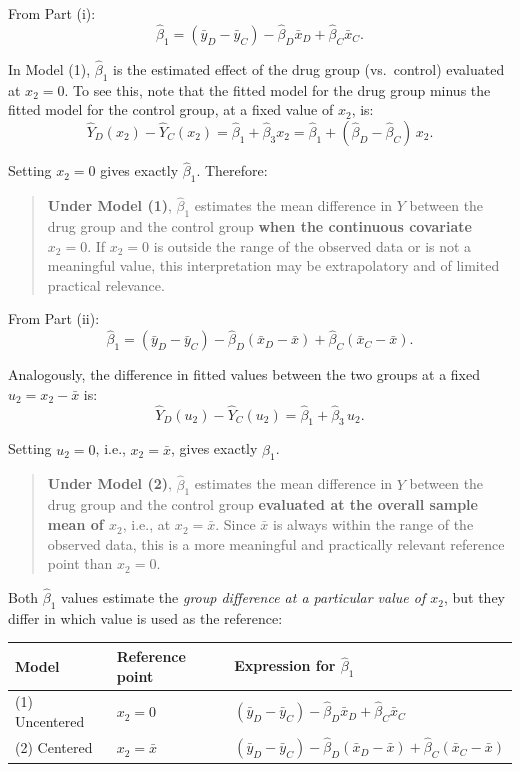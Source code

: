 \documentclass[letterpaper]{article}
\begin{document}
	From Part (i):
	\[
	\hat{\beta}_1 = (\bar{y}_D - \bar{y}_C) - \hat{\beta}_D \bar{x}_D + \hat{\beta}_C \bar{x}_C.
	\]
	
	In Model (1), $\hat{\beta}_1$ is the estimated effect of the drug group (vs.\ control) {evaluated at $x_2 = 0$}. To see this, note that the fitted model for the drug group minus the fitted model for the control group, at a fixed value of $x_2$, is:
	\[
	\hat{Y}_D(x_2) - \hat{Y}_C(x_2)
	= \hat{\beta}_1 + \hat{\beta}_3 x_2
	= \hat{\beta}_1 + (\hat{\beta}_D - \hat{\beta}_C)\, x_2.
	\]
	
	Setting $x_2 = 0$ gives exactly $\hat{\beta}_1$. Therefore:
	
	\begin{quote}
		\textbf{Under Model (1)}, $\hat{\beta}_1$ estimates the mean difference in $Y$ between the drug group and the control group \textbf{when the continuous covariate $x_2 = 0$}. If $x_2 = 0$ is outside the range of the observed data or is not a meaningful value, this interpretation may be extrapolatory and of limited practical relevance.
	\end{quote}

	
	From Part (ii):
	\[
	\hat{\beta}_1 = (\bar{y}_D - \bar{y}_C) - \hat{\beta}_D(\bar{x}_D - \bar{x}) + \hat{\beta}_C(\bar{x}_C - \bar{x}).
	\]
	
	Analogously, the difference in fitted values between the two groups at a fixed $u_2 = x_2 - \bar{x}$ is:
	\[
	\hat{Y}_D(u_2) - \hat{Y}_C(u_2) = \hat{\beta}_1 + \hat{\beta}_3\, u_2.
	\]
	
	Setting $u_2 = 0$, i.e., $x_2 = \bar{x}$, gives exactly $\hat{\beta}_1$.
	
	\begin{quote}
		\textbf{Under Model (2)}, $\hat{\beta}_1$ estimates the mean difference in $Y$ between the drug group and the control group \textbf{evaluated at the overall sample mean of $x_2$}, i.e., at $x_2 = \bar{x}$. Since $\bar{x}$ is always within the range of the observed data, this is a more meaningful and practically relevant reference point than $x_2 = 0$.
	\end{quote}

	
	Both $\hat{\beta}_1$ values estimate the \emph{group difference at a particular value of $x_2$}, but they differ in {which} value is used as the reference:
	
	\begin{center}
		\begin{tabular}{lll}
			\toprule
			Model & Reference point & Expression for $\hat{\beta}_1$ \\
			\midrule
			(1) Uncentered & $x_2 = 0$ & $(\bar{y}_D - \bar{y}_C) - \hat{\beta}_D\bar{x}_D + \hat{\beta}_C\bar{x}_C$ \\[4pt]
			(2) Centered   & $x_2 = \bar{x}$ & $(\bar{y}_D - \bar{y}_C) - \hat{\beta}_D(\bar{x}_D-\bar{x}) + \hat{\beta}_C(\bar{x}_C-\bar{x})$ \\
			\bottomrule
		\end{tabular}
	\end{center}
	
\end{document}
